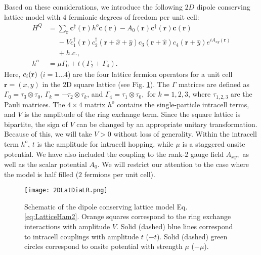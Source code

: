 \documentclass[prb,aps,twocolumn,groupaddress,floatfix]{revtex4-1}
\begin{document}
Based on these considerations, we introduce the following $2D$ dipole conserving lattice model with 4 fermionic degrees of freedom per unit cell:
\begin{equation}
\begin{split}
H^{Q} &= \sum_{\bm{r}} \bm{c}^\dagger(\bm{r}) h^o \bm{c}(\bm{r}) - A_0(\bm{r}) \bm{c}^\dagger(\bm{r}) \bm{c}(\bm{r})\\&\phantom{=} - V c_1^\dagger(\bm{r})c^\dagger_2(\bm{r}+\hat{x}+\hat{y})c_3(\bm{r}+\hat{x})c_4(\bm{r}+\hat{y})e^{i A_{xy}(\bm{r})} \\&\phantom{=}+ h.c.,\\
h^o &= \mu \Gamma_0 +t (\Gamma_2+\Gamma_4).
\end{split}\label{eq:LatticeHam2}
\end{equation}
Here, $c_i({\bf{r}})$ ($i = 1...4$) are the four lattice fermion operators for a unit cell $\bm{r} = (x,y)$ in the $2$D square lattice (see Fig. \ref{fig:2DLatDia}). The $\Gamma$ matrices are defined as $\Gamma_0 = \tau_3 \otimes \tau_0$, $\Gamma_k = -\tau_2 \otimes \tau_k $, and $\Gamma_4 = \tau_1 \otimes \tau_0,$ for $k = 1,2,3$, where $\tau_{1,2,3}$ are the Pauli matrices. The $4\times 4$ matrix  $h^o$ contains the single-particle intracell terms, and $V$ is the amplitude of the ring exchange term. Since the square lattice is bipartite, the sign of $V$ can be changed by an appropriate unitary transformation. Because of this, we will take $V>0$ without loss of generality. Within the intracell term $h^o$,  $t$ is the amplitude for intracell hopping, while $\mu$ is a staggered onsite potential. We have also included the coupling to the rank-2 gauge field $A_{xy},$ as well as the scalar potential $A_0$. We will restrict our attention to the case where the model is half filled ($2$ fermions per unit cell). 

\begin{figure}
\texttt{[image: 2DLatDiaLR.png]}
\caption{Schematic of the dipole conserving lattice model Eq. \ref{eq:LatticeHam2}. Orange squares correspond to the ring exchange interactions with amplitude $V$. Solid (dashed) blue lines correspond to intracell couplings with amplitude $t$ ($-t$). Solid (dashed) green circles correspond to onsite potential with strength $\mu$ ($-\mu$). }\label{fig:2DLatDia}
\end{figure}
\end{document}
